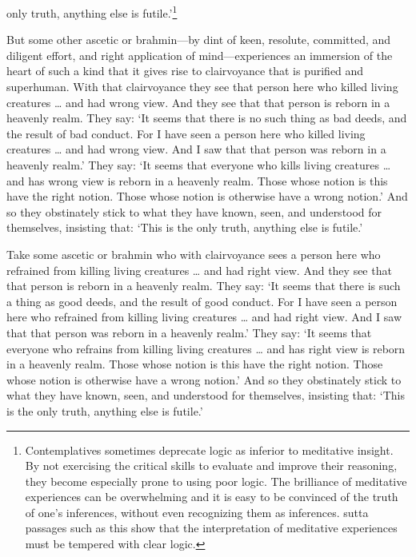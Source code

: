 \documentclass[12pt,openany]{book}%
\begin{document}
only truth, anything else is futile.’\footnote{Contemplatives sometimes deprecate logic as inferior to meditative insight. By not exercising the critical skills to evaluate and improve their reasoning, they become especially prone to using poor logic. The brilliance of meditative experiences can be overwhelming and it is easy to be convinced of the truth of one’s inferences, without even recognizing them as inferences. sutta passages such as this show that the interpretation of meditative experiences must be tempered with clear logic. } 

But some other ascetic or brahmin—by dint of keen, resolute, committed, and diligent effort, and right application of mind—experiences an immersion of the heart of such a kind that it gives rise to clairvoyance that is purified and superhuman. With that clairvoyance they see that person here who killed living creatures … and had wrong view. And they see that that person is reborn in a heavenly realm. They say: ‘It seems that there is no such thing as bad deeds, and the result of bad conduct. For I have seen a person here who killed living creatures … and had wrong view. And I saw that that person was reborn in a heavenly realm.’ They say: ‘It seems that everyone who kills living creatures … and has wrong view is reborn in a heavenly realm. Those whose notion is this have the right notion. Those whose notion is otherwise have a wrong notion.’ And so they obstinately stick to what they have known, seen, and understood for themselves, insisting that: ‘This is the only truth, anything else is futile.’ 

Take some ascetic or brahmin who with clairvoyance sees a person here who refrained from killing living creatures … and had right view. And they see that that person is reborn in a heavenly realm. They say: ‘It seems that there is such a thing as good deeds, and the result of good conduct. For I have seen a person here who refrained from killing living creatures … and had right view. And I saw that that person was reborn in a heavenly realm.’ They say: ‘It seems that everyone who refrains from killing living creatures … and has right view is reborn in a heavenly realm. Those whose notion is this have the right notion. Those whose notion is otherwise have a wrong notion.’ And so they obstinately stick to what they have known, seen, and understood for themselves, insisting that: ‘This is the only truth, anything else is futile.’ 
\end{document}
